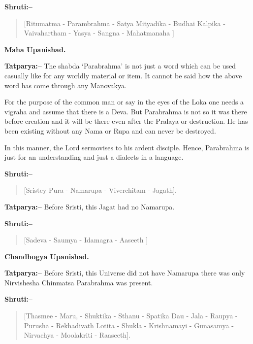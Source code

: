 \textbf{Shruti:–}

\begin{verse}
[Ritumatma - Parambrahma - Satya Mityadika - Bu\break dhai  Kalpika - Vaivahartham - Yasya - Sangna - Mahatmanaha ]
\end{verse}

\begin{flushright}
\textbf{Maha Upanishad.}
\end{flushright}

\textbf{Tatparya:–} The shabda ‘Parabrahma’ is not just a word which can be used casually like for any worldly material or item. It cannot be said how the above word has come through any Manovakya.

For the purpose of the common man or say in the eyes of the Loka one needs a vigraha and assume that there is a Deva. But Parabrahma is not so it was there before creation and it will be there even after the Pralaya or destruction. He has been existing without any Nama or Rupa and can never be destroyed.

In this manner, the Lord sermovises to his ardent disciple. Hence, Parabrahma is just for an understanding and just a dialects in a language.

\textbf{Shruti:–}

\begin{verse}
[Sristey Pura - Namarupa - Viverchitam - Jagath].
\end{verse}

\textbf{Tatparya:–} Before Sristi, this Jagat had no Namarupa.

\newpage

\textbf{Shruti:–}

\begin{verse}
[Sadeva - Saumya - Idamagra - Aaseeth ]
\end{verse}

\begin{flushright}
\textbf{Chandhogya Upanishad.}
\end{flushright}

\textbf{Tatparya:–} Before Sristi, this Universe did not have Namarupa there was only Nirvishesha Chinmatsa Parabrahma was present.

\textbf{Shruti:–}

\begin{verse}
[Thasmee - Maru, - Shuktika - Sthanu - Spatika Dau - Jala - Raupya - Purusha - Rekhadivath  Lotita - Shukla - Krishnamayi - Gunasamya - Nirvachya - Moolakriti - Raaseeth].
\end{verse}

